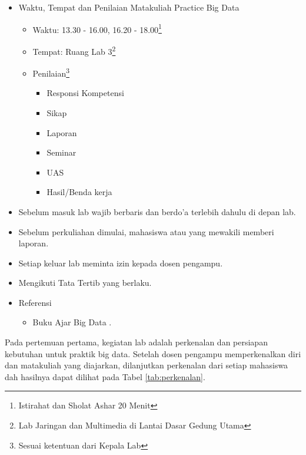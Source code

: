 \documentclass[a4paper]{tufte-handout}
\begin{document}
\begin{maybe}
    \begin{itemize}
    	\item Waktu, Tempat dan Penilaian Matakuliah Practice Big Data
    	\begin{itemize}
    	\item Waktu: 13.30 - 16.00, 16.20 - 18.00\footnote{Istirahat dan Sholat Ashar 20 Menit}
    	\item Tempat: Ruang Lab 3\footnote{Lab Jaringan dan Multimedia di Lantai Dasar Gedung Utama}
    	\item Penilaian\footnote{Sesuai ketentuan dari Kepala Lab}
    	\begin{itemize}
    	\item Responsi Kompetensi
    	\item Sikap
    	\item Laporan
    	\item Seminar
    	\item UAS
    	\item Hasil/Benda kerja
    	\end{itemize}
    	\end{itemize}
    	\item Sebelum masuk lab wajib berbaris dan berdo'a terlebih dahulu di depan lab.
    	\item Sebelum perkuliahan dimulai, mahasiswa atau yang mewakili memberi laporan.
    	\item Setiap keluar lab meminta izin kepada dosen pengampu.
    	\item Mengikuti Tata Tertib yang berlaku.
    	\item Referensi
    	\begin{itemize}
    		\item Buku Ajar Big Data \citep{Mursyidah2020}.
    	\end{itemize}
    \end{itemize}
\end{maybe}

\clearpage
{}


Pada pertemuan pertama, kegiatan lab adalah perkenalan dan persiapan kebutuhan untuk praktik big data. Setelah dosen pengampu memperkenalkan diri dan matakuliah yang diajarkan, dilanjutkan perkenalan dari setiap mahasiswa dah hasilnya dapat dilihat pada Tabel \ref{tab:perkenalan}.
\end{document}
